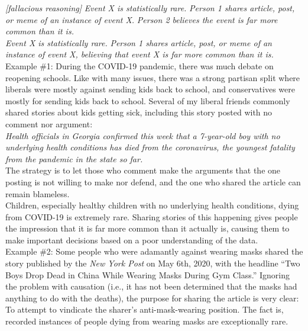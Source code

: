\documentclass[a4paper,12pt,single,pdftex]{scrartcl}
\begin{document}
    
      {\em [fallacious reasoning]} \newline
{\em Event X is statistically rare.} \newline
{\em Person 1 shares article, post, or meme of an instance of event X.} \newline
{\em Person 2 believes the event is far more common than it is.}
    \\

    
      {\em Event X is statistically rare.} \newline
{\em Person 1 shares article, post, or meme of an instance of event X, believing that event X is far more common than it is.}
    \\

    
      Example \#1: During the COVID-19 pandemic, there was much debate on reopening schools. Like with many issues, there was a strong partisan split where liberals were mostly against sending kids back to school, and conservatives were mostly for sending kids back to school. Several of my liberal friends commonly shared stories about kids getting sick, including this story posted with no comment nor argument:
    \\

    
      {\em Health officials in Georgia confirmed this week that a 7-year-old boy with no underlying health conditions has died from the coronavirus, the youngest fatality from the pandemic in the state so far.}
    \\

    
      The strategy is to let those who comment make the arguments that the one posting is not willing to make nor defend, and the one who shared the article can remain blameless.
    \\

    
      Children, especially healthy children with no underlying health conditions, dying from COVID-19 is extremely rare. Sharing stories of this happening gives people the impression that it is far more common than it actually is, causing them to make important decisions based on a poor understanding of the data.
    \\

    
      Example \#2: Some people who were adamantly against wearing masks shared the story published by the {\em New York Post} on May 6th, 2020, with the headline “Two Boys Drop Dead in China While Wearing Masks During Gym Class.” Ignoring the problem with causation (i.e., it has not been determined that the masks had anything to do with the deaths), the purpose for sharing the article is very clear: To attempt to vindicate the sharer’s anti-mask-wearing position. The fact is, recorded instances of people dying from wearing masks are exceptionally rare.
    \\
\end{document}
